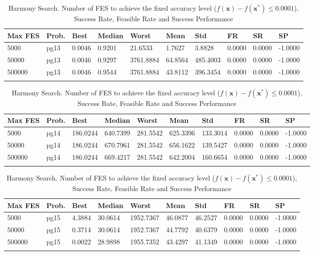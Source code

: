 \documentclass[10pt, a4paper]{book}
\begin{document}
\begin{center}
\begin{longtable}{l l l l l l l l l l}
\textbf{Max FES} & \textbf{Prob.} & \textbf{Best} & \textbf{Median} & \textbf{Worst} & \textbf{Mean} & \textbf{Std} & \textbf{FR} & \textbf{SR} & \textbf{SP} \\
\hline
5000 & pg13 & 0.0046 & 0.9201 & 21.6533 & 1.7627 & 3.8828 & 0.0000 & 0.0000 & -1.0000 \\
50000 & pg13 & 0.0046 & 0.9297 & 3761.8884 & 64.8564 & 485.4003 & 0.0000 & 0.0000 & -1.0000 \\
500000 & pg13 & 0.0046 & 0.9544 & 3761.8884 & 43.8112 & 396.3454 & 0.0000 & 0.0000 & -1.0000 \\

\caption{ Harmony Search. Number of FES to achieve the fixed accuracy level ($f(\mathbf{x}) - f(\mathbf{x}^{*}) \leq 0.0001$), Success Rate, Feasible Rate and Success Performance }
\end{longtable}
\end{center}

\begin{center}
\begin{longtable}{l l l l l l l l l l}
\textbf{Max FES} & \textbf{Prob.} & \textbf{Best} & \textbf{Median} & \textbf{Worst} & \textbf{Mean} & \textbf{Std} & \textbf{FR} & \textbf{SR} & \textbf{SP} \\
\hline
5000 & pg14 & 186.0244 & 640.7399 & 281.5542 & 625.3396 & 133.3014 & 0.0000 & 0.0000 & -1.0000 \\
50000 & pg14 & 186.0244 & 670.7961 & 281.5542 & 656.1622 & 139.5427 & 0.0000 & 0.0000 & -1.0000 \\
500000 & pg14 & 186.0244 & 669.4217 & 281.5542 & 642.2004 & 160.6654 & 0.0000 & 0.0000 & -1.0000 \\

\caption{ Harmony Search. Number of FES to achieve the fixed accuracy level ($f(\mathbf{x}) - f(\mathbf{x}^{*}) \leq 0.0001$), Success Rate, Feasible Rate and Success Performance }
\end{longtable}
\end{center}

\begin{center}
\begin{longtable}{l l l l l l l l l l}
\textbf{Max FES} & \textbf{Prob.} & \textbf{Best} & \textbf{Median} & \textbf{Worst} & \textbf{Mean} & \textbf{Std} & \textbf{FR} & \textbf{SR} & \textbf{SP} \\
\hline
5000 & pg15 & 4.3884 & 30.0614 & 1952.7367 & 46.0877 & 46.2527 & 0.0000 & 0.0000 & -1.0000 \\
50000 & pg15 & 0.3714 & 30.0614 & 1952.7367 & 44.7792 & 40.6379 & 0.0000 & 0.0000 & -1.0000 \\
500000 & pg15 & 0.0022 & 28.9898 & 1955.7352 & 43.4297 & 41.1349 & 0.0000 & 0.0000 & -1.0000 \\

\caption{ Harmony Search. Number of FES to achieve the fixed accuracy level ($f(\mathbf{x}) - f(\mathbf{x}^{*}) \leq 0.0001$), Success Rate, Feasible Rate and Success Performance }
\end{longtable}
\end{center}
\end{document}
